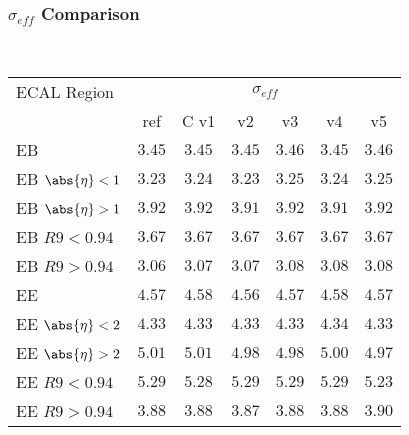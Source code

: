 \documentclass[8pt,serif]{beamer}
\begin{document}

\color{titlecolor}
\usebackgroundtemplate{
	\texttt{[image: ]}%
}
\begin{frame}
  \frametitle{$ \sigma_{eff} $ Comparison}
\\


  
  \begin{center}
    \emph{\dataSample}\xspace \invMassVarName
\tiny \begin{tabular}{|l|c|c|c|c|c|c|} \hline  
ECAL Region & \multicolumn{6}{c|}{$\sigma_{eff}$} \\
            & ref  & C v1  & v2  &  v3  &  v4  &  v5  \\ 
\hline           
EB                  & $3.45$ & $3.45$ & $3.45$ & $3.46$ & $3.45$ & $3.46$ \\
EB $\abs{\eta} < 1$ & $3.23$ & $3.24$ & $3.23$ & $3.25$ & $3.24$ & $3.25$ \\
EB $\abs{\eta} > 1$ & $3.92$ & $3.92$ & $3.91$ & $3.92$ & $3.91$ & $3.92$ \\
EB $R9 < 0.94$      & $3.67$ & $3.67$ & $3.67$ & $3.67$ & $3.67$ & $3.67$ \\
EB $R9 > 0.94$      & $3.06$ & $3.07$ & $3.07$ & $3.08$ & $3.08$ & $3.08$ \\
\hline
EE                  & $4.57$ & $4.58$ & $4.56$ & $4.57$ & $4.58$ & $4.57$ \\
EE $\abs{\eta} < 2$ & $4.33$ & $4.33$ & $4.33$ & $4.33$ & $4.34$ & $4.33$ \\
EE $\abs{\eta} > 2$ & $5.01$ & $5.01$ & $4.98$ & $4.98$ & $5.00$ & $4.97$ \\
EE $R9 < 0.94$      & $5.29$ & $5.28$ & $5.29$ & $5.29$ & $5.29$ & $5.23$ \\
EE $R9 > 0.94$      & $3.88$ & $3.88$ & $3.87$ & $3.88$ & $3.88$ & $3.90$ \\
\hline  
\end{tabular} 
  \end{center}


\end{frame}
\end{document}
